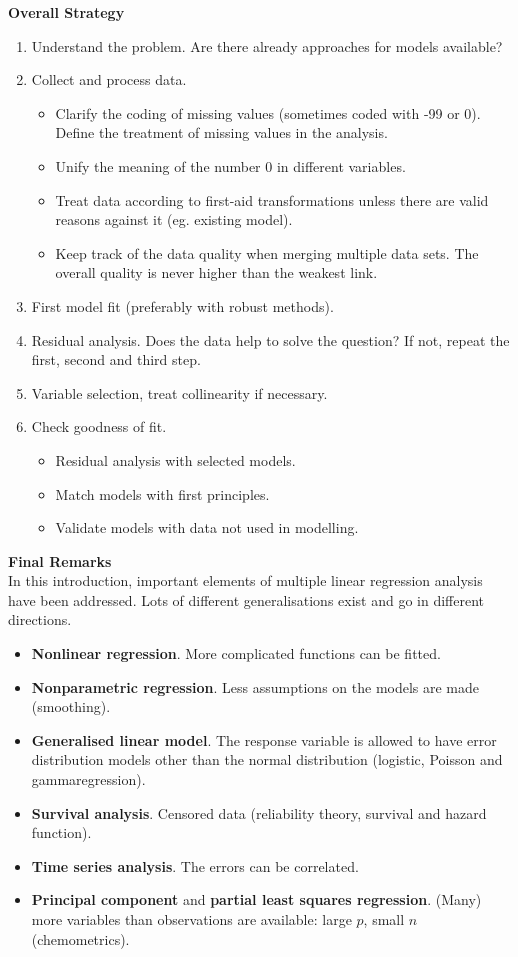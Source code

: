 \textbf{Overall Strategy}
\begin{enumerate}
  \item Understand the problem. Are there already approaches for models available?
  \item Collect and process data.
  \begin{itemize}
    \item Clarify the coding of missing values (sometimes coded with -99 or 0). Define the treatment of missing values in the analysis.
    \item Unify the meaning of the number 0 in different variables.
    \item Treat data according to first-aid transformations unless there are valid reasons against it (eg. existing model).
    \item Keep track of the data quality when merging multiple data sets. The overall quality is never higher than the weakest link.
  \end{itemize}
  \item First model fit (preferably with robust methods).
  \item Residual analysis. Does the data help to solve the question? If not, repeat the first,
  second and third step.
  \item Variable selection, treat collinearity if necessary.
  \item Check goodness of fit.
  \begin{itemize}
    \item Residual analysis with selected models.
    \item Match models with first principles.
    \item Validate models with data not used in modelling.
  \end{itemize}
\end{enumerate}

\textbf{Final Remarks}\\
In this introduction, important elements of multiple linear regression analysis have been addressed. Lots of different generalisations exist and go in different directions.
\begin{itemize}
  \item \textbf{Nonlinear regression}. More complicated functions can be fitted.
  \item \textbf{Nonparametric regression}. Less assumptions on the models are made (smoothing).
  \item \textbf{Generalised linear model}. The response variable is allowed to have error distribution models other than the normal distribution (logistic, Poisson and gammaregression).
  \item \textbf{Survival analysis}. Censored data (reliability theory, survival and hazard function).
  \item \textbf{Time series analysis}. The errors can be correlated.
  \item \textbf{Principal component} and \textbf{partial least squares regression}. (Many) more variables than observations are available: large $p$, small $n$ (chemometrics).
\end{itemize}
